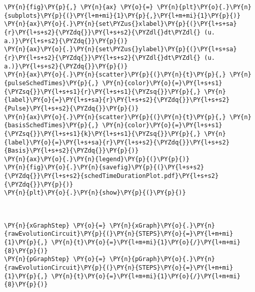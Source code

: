     \begin{tcolorbox}[breakable, size=fbox, boxrule=1pt, pad at break*=1mm,colback=cellbackground, colframe=cellborder]
\begin{Verbatim}[commandchars=\\\{\}]
\PY{n}{fig}\PY{p}{,} \PY{n}{ax} \PY{o}{=} \PY{n}{plt}\PY{o}{.}\PY{n}{subplots}\PY{p}{(}\PY{l+m+mi}{1}\PY{p}{,}\PY{l+m+mi}{1}\PY{p}{)}
\PY{n}{ax}\PY{o}{.}\PY{n}{set\PYZus{}xlabel}\PY{p}{(}\PY{l+s+sa}{r}\PY{l+s+s2}{\PYZdq{}}\PY{l+s+s2}{\PYZdl{}dt\PYZdl{} (u. a.)}\PY{l+s+s2}{\PYZdq{}}\PY{p}{)}
\PY{n}{ax}\PY{o}{.}\PY{n}{set\PYZus{}ylabel}\PY{p}{(}\PY{l+s+sa}{r}\PY{l+s+s2}{\PYZdq{}}\PY{l+s+s2}{\PYZdl{}dt\PYZdl{} (u. a.)}\PY{l+s+s2}{\PYZdq{}}\PY{p}{)}
\PY{n}{ax}\PY{o}{.}\PY{n}{scatter}\PY{p}{(}\PY{n}{t}\PY{p}{,} \PY{n}{pulseSchedTimes}\PY{p}{,} \PY{n}{color}\PY{o}{=}\PY{l+s+s1}{\PYZsq{}}\PY{l+s+s1}{r}\PY{l+s+s1}{\PYZsq{}}\PY{p}{,} \PY{n}{label}\PY{o}{=}\PY{l+s+sa}{r}\PY{l+s+s2}{\PYZdq{}}\PY{l+s+s2}{Pulse}\PY{l+s+s2}{\PYZdq{}}\PY{p}{)}
\PY{n}{ax}\PY{o}{.}\PY{n}{scatter}\PY{p}{(}\PY{n}{t}\PY{p}{,} \PY{n}{basisSchedTimes}\PY{p}{,} \PY{n}{color}\PY{o}{=}\PY{l+s+s1}{\PYZsq{}}\PY{l+s+s1}{k}\PY{l+s+s1}{\PYZsq{}}\PY{p}{,} \PY{n}{label}\PY{o}{=}\PY{l+s+sa}{r}\PY{l+s+s2}{\PYZdq{}}\PY{l+s+s2}{Basis}\PY{l+s+s2}{\PYZdq{}}\PY{p}{)}
\PY{n}{ax}\PY{o}{.}\PY{n}{legend}\PY{p}{(}\PY{p}{)}
\PY{n}{fig}\PY{o}{.}\PY{n}{savefig}\PY{p}{(}\PY{l+s+s2}{\PYZdq{}}\PY{l+s+s2}{schedTimeDurationPlot.pdf}\PY{l+s+s2}{\PYZdq{}}\PY{p}{)}
\PY{n}{plt}\PY{o}{.}\PY{n}{show}\PY{p}{(}\PY{p}{)}
\end{Verbatim}
\end{tcolorbox}

    \begin{center}
    \end{center}
    { \hspace*{\fill} \\}
    
    \begin{tcolorbox}[breakable, size=fbox, boxrule=1pt, pad at break*=1mm,colback=cellbackground, colframe=cellborder]
\begin{Verbatim}[commandchars=\\\{\}]
\PY{n}{xGraphStep} \PY{o}{=} \PY{n}{xGraph}\PY{o}{.}\PY{n}{rawEvolutionCircuit}\PY{p}{(}\PY{n}{STEPS}\PY{o}{=}\PY{l+m+mi}{1}\PY{p}{,} \PY{n}{t}\PY{o}{=}\PY{l+m+mi}{1}\PY{o}{/}\PY{l+m+mi}{8}\PY{p}{)}
\PY{n}{pGraphStep} \PY{o}{=} \PY{n}{pGraph}\PY{o}{.}\PY{n}{rawEvolutionCircuit}\PY{p}{(}\PY{n}{STEPS}\PY{o}{=}\PY{l+m+mi}{1}\PY{p}{,} \PY{n}{t}\PY{o}{=}\PY{l+m+mi}{1}\PY{o}{/}\PY{l+m+mi}{8}\PY{p}{)}
\end{Verbatim}
\end{tcolorbox}

